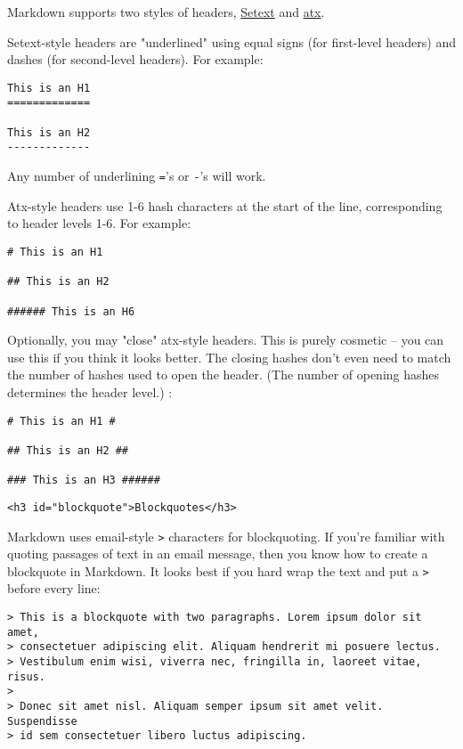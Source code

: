 Markdown supports two styles of headers, \href{http://docutils.sourceforge.net/mirror/setext.html}{Setext} and \href{http://www.aaronsw.com/2002/atx/}{atx}.



Setext-style headers are "underlined" using equal signs (for first-level
headers) and dashes (for second-level headers). For example:

\begin{lstlisting}
This is an H1
=============

This is an H2
-------------
\end{lstlisting}




Any number of underlining \texttt{=}'s or \texttt{-}'s will work.



Atx-style headers use 1-6 hash characters at the start of the line,
corresponding to header levels 1-6. For example:

\begin{lstlisting}
# This is an H1

## This is an H2

###### This is an H6
\end{lstlisting}




Optionally, you may "close" atx-style headers. This is purely
cosmetic -- you can use this if you think it looks better. The
closing hashes don't even need to match the number of hashes
used to open the header. (The number of opening hashes
determines the header level.) :

\begin{lstlisting}
# This is an H1 #

## This is an H2 ##

### This is an H3 ######
\end{lstlisting}


\begin{lstlisting}<h3 id="blockquote">Blockquotes</h3>\end{lstlisting}




Markdown uses email-style \texttt{>} characters for blockquoting. If you're
familiar with quoting passages of text in an email message, then you
know how to create a blockquote in Markdown. It looks best if you hard
wrap the text and put a \texttt{>} before every line:

\begin{lstlisting}
> This is a blockquote with two paragraphs. Lorem ipsum dolor sit amet,
> consectetuer adipiscing elit. Aliquam hendrerit mi posuere lectus.
> Vestibulum enim wisi, viverra nec, fringilla in, laoreet vitae, risus.
> 
> Donec sit amet nisl. Aliquam semper ipsum sit amet velit. Suspendisse
> id sem consectetuer libero luctus adipiscing.
\end{lstlisting}




